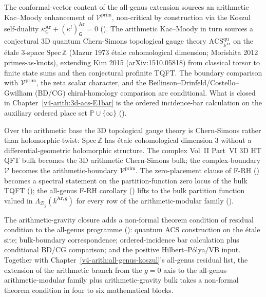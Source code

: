 The conformal-vector content of the all-genus extension sources an
arithmetic Kac--Moody enhancement of \(\mathcal{V}^{\mathrm{prim}}\),
non-critical by construction via the Koszul self-duality
\(\kappa^{\mathrm{Ar}}_{\mathsf{G}}+(\kappa^{!})^{\mathrm{Ar}}_{\mathsf{G}}=0\)
(). The arithmetic Kac--Moody in turn
sources a conjectural 3D quantum Chern-Simons topological gauge theory
\(\mathrm{ACS}^{\mathrm{qu}}_{k^{\mathrm{Ar}}}\) on the étale 3-space
\(\overline{\mathrm{Spec}\,\mathbb{Z}}\) (Mazur 1973 étale cohomological
dimension; Morishita 2012 primes-as-knots), extending Kim 2015
(arXiv:1510.05818) from classical torsor to finite state sums and then
conjectural profinite TQFT. The boundary comparison with
\(\mathcal{V}^{\mathrm{prim}}\), the zeta scalar character, and the
Beilinson--Drinfeld/Costello--Gwilliam (BD/CG) chiral-homology
comparison are conditional. What is closed in
Chapter~\ref{v4-arith:3d-acs-E1bar} is the ordered incidence-bar
calculation on the auxiliary ordered place set
\(\mathbb{P}\cup\{\infty\}\)
().

Over the arithmetic base the 3D topological gauge theory is
Chern-Simons rather than holomorphic-twist: \(\overline{\mathrm{Spec}\,\mathbb{Z}}\)
has étale cohomological dimension \(3\) without a differential-geometric
holomorphic structure. The complex Vol~II Part~VI 3D HT QFT bulk
becomes the 3D arithmetic Chern-Simons bulk; the complex-boundary
\(\mathcal{V}\) becomes the arithmetic-boundary \(\mathcal{V}^{\mathrm{prim}}\).
The zero-placement clause of F-RH () becomes
a spectral statement on the partition-function zero locus of the bulk TQFT
(); the all-genus
F-RH corollary () lifts to the
bulk partition function valued in \(\Lambda_{\mathcal{D}_g}(k^{\mathrm{Ar},g})\)
for every row of the arithmetic-modular family
().

The arithmetic-gravity closure adds a non-formal theorem condition of
residual condition to the all-genus programme
(): quantum ACS construction on the
étale site; bulk-boundary correspondence; ordered-incidence bar
calculation plus conditional BD/CG comparison; and the positive
Hilbert--P\'olya/VB input. Together with Chapter~\ref{v4-arith:all-genus-koszul}'s
all-genus residual list, the extension of the arithmetic branch from
the \(g=0\) axis to the all-genus arithmetic-modular family plus
arithmetic-gravity bulk takes a non-formal theorem condition in four to
six mathematical blocks.
